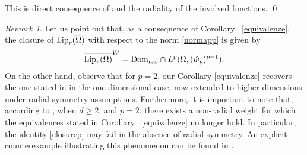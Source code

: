 \documentclass[11pt,leqno]{amsart}
\theoremstyle{remark}
\newtheorem{oss}[teo]{Remark}
\theoremstyle{definition}
\theoremstyle{definition}
\newcommand{\ov}[1]{\overline{#1}}
\begin{document}
\proof 
This is direct consequence of \cite[Corollary 3.2]{CCMH1} and the radiality of the involved functions.
\qed
\begin{oss}
Let us point out that, as a consequence of Corollary ~\ref{equivalenze}, the closure of ${\rm Lip}_{r}(\ov{\Omega})$ with respect to the norm \eqref{normapp} is given by
\begin{align}\label{closurep}
\overline{{\rm Lip}_{r}(\ov{\Omega})}^{W}={\rm{Dom}}_{{\mathrm r},w}\cap L^{p}(\Omega,(\hat{w}_{p})^{p-1}).
\end{align}
On the other hand,  observe that for $p=2$, our Corollary \ref{equivalenze} recovers the one stated in \cite[Corollary 4.23]{CC} in the one-dimensional case, now extended to higher dimensions under radial symmetry assumptions. Furthermore, it is important to note that, according to \cite[Remark 3.4]{CC}, when $d\geq 2$, and $p=2$, there exists a non-radial weight for which the equivalences stated in Corollary ~\ref{equivalenze} no longer hold. In particular, the identity \eqref{closurep} may fail in the absence of radial symmetry. An explicit counterexample illustrating this phenomenon can be found in \cite[Example 2.2]{CPSC}.
\end{oss}
\end{document}
